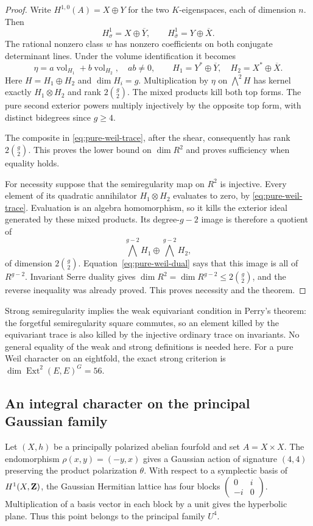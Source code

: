 \begin{proof}
Write $H^{1,0}(A)=X\oplus Y$ for the two $K$-eigenspaces, each of dimension $n$. Then
\[
 H^1_\sigma=X\oplus\overline Y,
 \qquad H^1_{\bar\sigma}=Y\oplus\overline X.
\]
The rational nonzero class $w$ has nonzero coefficients on both conjugate determinant lines. Under the volume identification it becomes
\[
 \eta=a\operatorname{vol}_{H_1}+b\operatorname{vol}_{H_2},
 \quad ab\ne0,\qquad
 H_1=Y^*\oplus\overline Y,\quad H_2=X^*\oplus\overline X.
\]
Here $H=H_1\oplus H_2$ and $\dim H_i=g$. Multiplication by $\eta$ on $\bigwedge^2H$ has kernel exactly $H_1\otimes H_2$ and rank $2\binom g2$. The mixed products kill both top forms. The pure second exterior powers multiply injectively by the opposite top form, with distinct bidegrees since $g\ge4$.

The composite in \eqref{eq:pure-weil-trace}, after the shear, consequently has rank $2\binom g2$. This proves the lower bound on $\dim R^2$ and proves sufficiency when equality holds.

For necessity suppose that the semiregularity map on $R^2$ is injective. Every element of its quadratic annihilator $H_1\otimes H_2$ evaluates to zero, by \eqref{eq:pure-weil-trace}. Evaluation is an algebra homomorphism, so it kills the exterior ideal generated by these mixed products. Its degree-$g-2$ image is therefore a quotient of
\[
 \bigwedge^{g-2}H_1\oplus\bigwedge^{g-2}H_2,
\]
of dimension $2\binom g2$. Equation~\eqref{eq:pure-weil-dual} says that this image is all of $R^{g-2}$. Invariant Serre duality gives $\dim R^2=\dim R^{g-2}\le2\binom g2$, and the reverse inequality was already proved. This proves necessity and the theorem.
\end{proof}

Strong semiregularity implies the weak equivariant condition in Perry's theorem: the forgetful semiregularity square commutes, so an element killed by the equivariant trace is also killed by the injective ordinary trace on invariants. No general equality of the weak and strong definitions is needed here. For a pure Weil character on an eightfold, the exact strong criterion is $\dim\operatorname{Ext}^2(E,E)^G=56$.

\subsection{An integral character on the principal Gaussian family}

Let $(X,h)$ be a principally polarized abelian fourfold and set $A=X\times X$. The endomorphism $\rho(x,y)=(-y,x)$ gives a Gaussian action of signature $(4,4)$ preserving the product polarization $\theta$. With respect to a symplectic basis of $H^1(X,\mathbf Z)$, the Gaussian Hermitian lattice has four blocks $\left(\begin{smallmatrix}0&i\\-i&0\end{smallmatrix}\right)$. Multiplication of a basis vector in each block by a unit gives the hyperbolic plane. Thus this point belongs to the principal family $U^4$.

